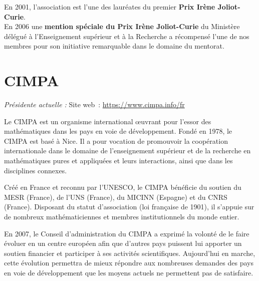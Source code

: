En 2001, l'association est l'une des laur\'eates du premier \textbf{Prix Ir\`ene Joliot-Curie}. \\
En 2006 une \textbf{mention sp\'eciale du Prix Ir\`ene Joliot-Curie} du Minist\`ere d\'el\'egu\'e \`a l'Enseignement sup\'erieur et \`a la Recherche a r\'ecompens\'e l'une de nos membres pour son initiative remarquable dans le domaine du mentorat. \\






\section{CIMPA}

\emph{Pr\'esident\mp e actuel\mp le : }\hfill Site web~: \url{https://www.cimpa.info/fr}


\smallskip


Le CIMPA est un organisme international
\oe uvrant pour l'essor des
math\'ematiques dans les pays en
voie de d\'eveloppement.
Fond\'e en 1978, le CIMPA est bas\'e
\`a Nice. Il a pour vocation de promouvoir
la coop\'eration internationale
dans le domaine de l'enseignement
sup\'erieur et de la recherche en math\'ematiques
pures et appliqu\'ees et
leurs interactions, ainsi que dans les
disciplines connexes.

Cr\'e\'e en France et reconnu par
l'UNESCO, le CIMPA b\'en\'eficie du
soutien du MESR (France), de l'UNS
(France), du MICINN (Espagne) et
du CNRS (France). Disposant du
statut d'association (loi fran\c caise de
1901), il s'appuie sur de nombreux
math\'ematicien\mp nes et membres institutionnels
du monde entier.

En 2007, le Conseil d'administration
du CIMPA a exprim\'e la volont\'e
de le faire \'evoluer en un centre
europ\'een afin que d'autres pays
puissent lui apporter un soutien
financier et participer \`a ses activit\'es
scientifiques. Aujourd'hui en
marche, cette \'evolution permettra
de mieux r\'epondre aux nombreuses
demandes des pays en voie de d\'eveloppement
que les moyens actuels
ne permettent pas de satisfaire.



